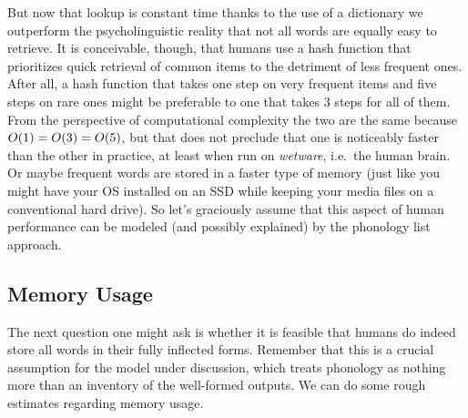 But now that lookup is constant time thanks to the use of a dictionary we outperform the psycholinguistic reality that not all words are equally easy to retrieve.
It is conceivable, though, that humans use a hash function that prioritizes quick retrieval of common items to the detriment of less frequent ones.
After all, a hash function that takes one step on very frequent items and five steps on rare ones might be preferable to one that takes 3 steps for all of them.
From the perspective of computational complexity the two are the same because $O(1) = O(3) = O(5)$, but that does not preclude that one is noticeably faster than the other in practice, at least when run on \emph{wetware}, i.e.\ the human brain.
Or maybe frequent words are stored in a faster type of memory (just like you might have your OS installed on an SSD while keeping your media files on a conventional hard drive).
So let's graciously assume that this aspect of human performance can be modeled (and possibly explained) by the phonology list approach.

\subsection{Memory Usage}

The next question one might ask is whether it is feasible that humans do indeed store all words in their fully inflected forms.
Remember that this is a crucial assumption for the model under discussion, which treats phonology as nothing more than an inventory of the well-formed outputs.
We can do some rough estimates regarding memory usage.

